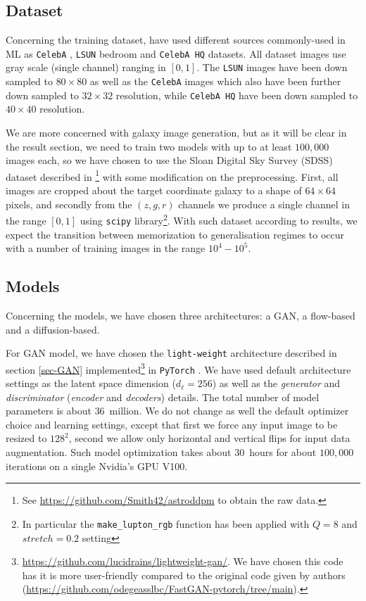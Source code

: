 \documentclass[11pt]{amsart}
\begin{document}
\subsection{Dataset}
%
Concerning the training dataset, \cite{kadkhodaie2024generalization}  have used different sources commonly-used in ML as \texttt{CelebA} \citep{Liu2015}, \texttt{LSUN} bedroom \citep{Yu2015} and  \texttt{CelebA HQ} \citep{KarrasALL18} datasets. All dataset images use  gray scale (single channel) ranging in $[0,1]$.  The \texttt{LSUN}  images have been down sampled to $80\times 80$ as well as the \texttt{CelebA} images which also have been further down sampled to $32\times 32$ resolution, while \texttt{CelebA HQ}  have been down sampled to $40\times 40$ resolution.

We are more concerned with galaxy image generation, but as it will be clear in the result section, we need to train two models with up to at least $100,000$ images each, so we have chosen to use the Sloan Digital Sky Survey (SDSS) dataset described in \citep{smith2021}\footnote{See \url{https://github.com/Smith42/astroddpm} to obtain the raw data.} with some modification on the preprocessing. First, all images are cropped about the target coordinate galaxy to a shape of $64\times 64$ pixels, and secondly from the $(z,g,r)$ channels we produce a single  channel in the range $[0,1]$ using \texttt{scipy} \citep{2020SciPy-NMeth} library\footnote{In particular the \texttt{make\_lupton\_rgb} function has been applied with $Q=8$ and $stretch=0.2$ setting}. %
 With such dataset according to \cite{kadkhodaie2024generalization} results, we expect the transition between memorization to generalisation regimes to occur with a number of training images in the range $10^4-10^5$. 

\subsection{Models}
%
Concerning the models, we have chosen three architectures: a GAN, a flow-based and a diffusion-based. 

For GAN model, we have chosen the \texttt{light-weight} architecture described in section \ref{sec-GAN} implemented\footnote{\url{https://github.com/lucidrains/lightweight-gan/}. We have chosen this code has it is more user-friendly compared to the original code given by authors (\url{https://github.com/odegeasslbc/FastGAN-pytorch/tree/main}).} in \texttt{PyTorch} \citep{PyTorch2019}. We have used default architecture settings as the latent space dimension ($d_\ell=256$) as well as the \textit{generator} and \textit{discriminator} (\textit{encoder} and \textit{decoders}) details. The total number of model parameters is about $36$~million.  We do not change as well the default optimizer choice and learning settings, except that first we force any input image to be resized to $128^2$, second we allow only horizontal and vertical flips for input data augmentation. Such model optimization takes about 30~hours for about $100,000$ iterations on a single Nvidia's GPU V100.
\end{document}
